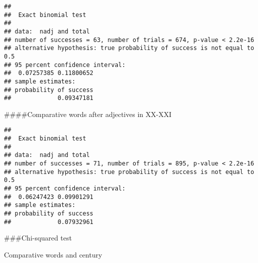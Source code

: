 \documentclass[
]{article}
\newenvironment{Shaded}{\begin{snugshade}}{\end{snugshade}}
\newcommand{\DataTypeTok}[1]{\textcolor[rgb]{0.13,0.29,0.53}{#1}}
\newcommand{\DecValTok}[1]{\textcolor[rgb]{0.00,0.00,0.81}{#1}}
\newcommand{\KeywordTok}[1]{\textcolor[rgb]{0.13,0.29,0.53}{\textbf{#1}}}
\newcommand{\NormalTok}[1]{#1}
\newcommand{\OperatorTok}[1]{\textcolor[rgb]{0.81,0.36,0.00}{\textbf{#1}}}
\newcommand{\StringTok}[1]{\textcolor[rgb]{0.31,0.60,0.02}{#1}}
\begin{document}
\begin{verbatim}
## 
##  Exact binomial test
## 
## data:  nadj and total
## number of successes = 63, number of trials = 674, p-value < 2.2e-16
## alternative hypothesis: true probability of success is not equal to 0.5
## 95 percent confidence interval:
##  0.07257385 0.11800652
## sample estimates:
## probability of success 
##             0.09347181
\end{verbatim}

\#\#\#\#Comparative words after adjectives in XX-XXI

\begin{Shaded}
\end{Shaded}

\begin{verbatim}
## 
##  Exact binomial test
## 
## data:  nadj and total
## number of successes = 71, number of trials = 895, p-value < 2.2e-16
## alternative hypothesis: true probability of success is not equal to 0.5
## 95 percent confidence interval:
##  0.06247423 0.09901291
## sample estimates:
## probability of success 
##             0.07932961
\end{verbatim}

\#\#\#Chi-squared test

Comparative words and century

\begin{Shaded}
\end{Shaded}
\end{document}
